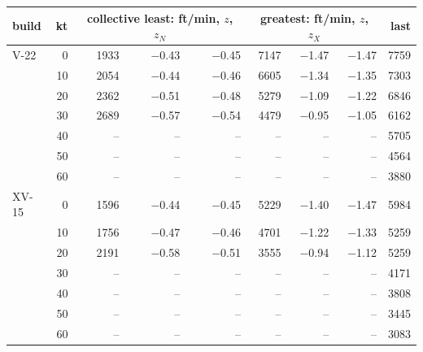 \begin{tabular}{@{}lrrrrrrrr@{}}
\toprule
build & kt & \multicolumn{3}{c}{collective least: ft/min, $z$, $z_N$} & \multicolumn{3}{c}{greatest: ft/min, $z$, $z_X$} & last \\
\midrule
V-22 & 0 & 1933 & $-$0.43 & $-$0.45 & 7147 & $-$1.47 & $-$1.47 & 7759 \\
 & 10 & 2054 & $-$0.44 & $-$0.46 & 6605 & $-$1.34 & $-$1.35 & 7303 \\
 & 20 & 2362 & $-$0.51 & $-$0.48 & 5279 & $-$1.09 & $-$1.22 & 6846 \\
 & 30 & 2689 & $-$0.57 & $-$0.54 & 4479 & $-$0.95 & $-$1.05 & 6162 \\
 & 40 & -- & -- & -- & -- & -- & -- & 5705 \\
 & 50 & -- & -- & -- & -- & -- & -- & 4564 \\
 & 60 & -- & -- & -- & -- & -- & -- & 3880 \\
XV-15 & 0 & 1596 & $-$0.44 & $-$0.45 & 5229 & $-$1.40 & $-$1.47 & 5984 \\
 & 10 & 1756 & $-$0.47 & $-$0.46 & 4701 & $-$1.22 & $-$1.33 & 5259 \\
 & 20 & 2191 & $-$0.58 & $-$0.51 & 3555 & $-$0.94 & $-$1.12 & 5259 \\
 & 30 & -- & -- & -- & -- & -- & -- & 4171 \\
 & 40 & -- & -- & -- & -- & -- & -- & 3808 \\
 & 50 & -- & -- & -- & -- & -- & -- & 3445 \\
 & 60 & -- & -- & -- & -- & -- & -- & 3083 \\
\bottomrule
\end{tabular}
